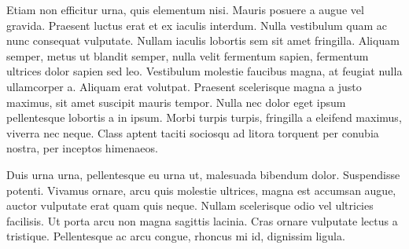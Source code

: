 \documentclass[
  a5paper,
  smalldemyvopaper,10pt,twoside,onecolumn,openright,extrafontsizes,hidelinks]{memoir}
\begin{document}
Etiam non efficitur urna, quis elementum nisi. Mauris posuere a augue
vel gravida. Praesent luctus erat et ex iaculis interdum. Nulla
vestibulum quam ac nunc consequat vulputate. Nullam iaculis lobortis sem
sit amet fringilla. Aliquam semper, metus ut blandit semper, nulla velit
fermentum sapien, fermentum ultrices dolor sapien sed leo. Vestibulum
molestie faucibus magna, at feugiat nulla ullamcorper a. Aliquam erat
volutpat. Praesent scelerisque magna a justo maximus, sit amet suscipit
mauris tempor. Nulla nec dolor eget ipsum pellentesque lobortis a in
ipsum. Morbi turpis turpis, fringilla a eleifend maximus, viverra nec
neque. Class aptent taciti sociosqu ad litora torquent per conubia
nostra, per inceptos himenaeos.

Duis urna urna, pellentesque eu urna ut, malesuada bibendum dolor.
Suspendisse potenti. Vivamus ornare, arcu quis molestie ultrices, magna
est accumsan augue, auctor vulputate erat quam quis neque. Nullam
scelerisque odio vel ultricies facilisis. Ut porta arcu non magna
sagittis lacinia. Cras ornare vulputate lectus a tristique. Pellentesque
ac arcu congue, rhoncus mi id, dignissim ligula.


\backmatter
\end{document}
